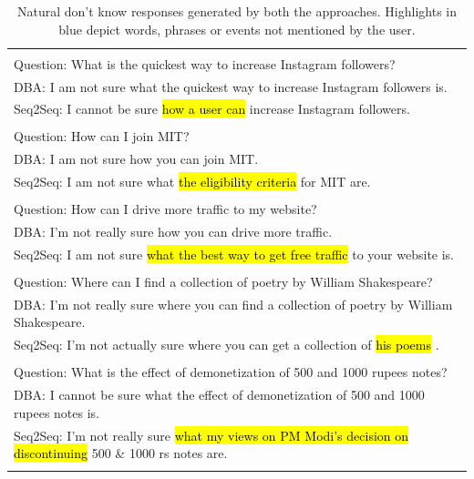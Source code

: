 \documentclass[11pt,a4paper]{article}
\newcommand{\hlc}[2][yellow]{{%
    \colorlet{foo}{#1}%
    \sethlcolor{foo}\hl{#2}}%
}
\begin{document}
\begin{table}[ht!]
\small
\centering
\begin{tabular}{|l|}
\hline
\\
Question: What is the quickest way to increase Instagram followers?\\
DBA: I am not sure what the quickest way to increase Instagram followers is.\\
Seq2Seq: I cannot be sure \hlc[cyan!40]{how a user can} increase Instagram followers.\\
\\
Question: How can I join MIT?\\
DBA: I am not sure how you can join MIT.\\
Seq2Seq: I am not sure what \hlc[cyan!40]{the eligibility criteria} for MIT are.\\
\\
Question: How can I drive more traffic to my website?\\
DBA: I'm not really sure how you can drive more traffic.\\
Seq2Seq: I am not sure \hlc[cyan!40]{what the best way to get free traffic} to your website is.\\
\\
Question: Where can I find a collection of poetry by William Shakespeare?\\
DBA: I’m not really sure where you can find a collection of poetry by William Shakespeare.\\
Seq2Seq: I’m not actually sure where you can get a collection of \hlc[cyan!40]{his poems}.\\
\\
Question: What is the effect of demonetization of 500 and 1000 rupees notes?\\
DBA: I cannot be sure what the effect of demonetization of 500 and 1000 rupees notes is.\\
Seq2Seq: I'm not really sure \hlc[cyan!40]{what my views on PM Modi's decision on discontinuing} 500 \& 1000 rs notes are.\\ \\
\hline
\end{tabular}
\caption{Natural don't know responses generated by both the approaches. Highlights in blue depict words, phrases or events not mentioned by the user.}
\label{seq2seq example-table}
\end{table}
   
\end{document}
